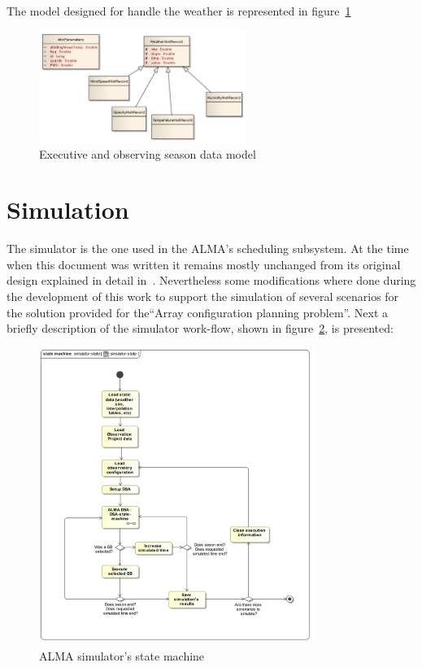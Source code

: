 The model designed for handle the weather is represented in figure~\ref{fig:datamodel-weather}

\begin{figure}[]	
\begin{center}
\includegraphics[width=0.6\textwidth]{images/Weather}
\caption{Executive and observing season data model}
\end{center}
\label{fig:datamodel-weather}
\end{figure}

\section {Simulation}
The simulator is the one used in the ALMA's scheduling subsystem. At the time when this document was written it remains mostly unchanged from its original design explained in detail in~\cite{hoffstadt10}. Nevertheless some modifications where done during the development of this work to support the simulation of several scenarios for the solution provided for the``Array configuration planning problem''. Next a briefly description of the simulator work-flow, shown in figure~\ref{fig:sim-state-machine}, is presented:

\begin{figure}[]	
\begin{center}
\includegraphics[width=0.8\textwidth]{images/simulator-state-machine}
\end{center}
\caption{ALMA simulator's state machine}
\label{fig:sim-state-machine}
\end{figure}

